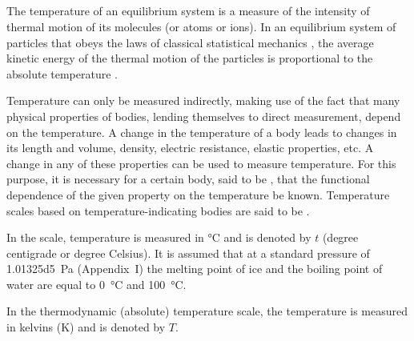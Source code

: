 \subsection{}\label{8.3.4} The temperature of an equilibrium system is a measure of the intensity of thermal motion of its molecules (or atoms or ions). In an equilibrium system of particles that obeys the laws of classical statistical mechanics , the average kinetic energy of the thermal motion of the particles is pro­portional to the absolute temperature .

Temperature can only be measured indirectly, making use of the fact that many physical properties of bodies, lending themselves to direct measurement, depend on the temperature. A change in the temperature of a body leads to changes in its length and volume, density, electric resistance, elastic prop­erties, etc. A change in any of these properties can be used to measure temperature. For this purpose, it is necessary for a certain body, said to be , that the functional dependence of the given property on the temperature be known. Temperature scales based on temperature-indicating bodies are said to be .

In the  scale, temperature is measured in  \si{\degreeCelsius} and is denoted by $t$ (degree centigrade or degree Celsius). It is assumed that at a standard pressure of \SI{1.01325d5}{\pascal} (Appendix~I) the melting point of ice and the boiling point of water are equal to \SI{0}{\degreeCelsius} and \SI{100}{\degreeCelsius}.

In the thermodynamic (absolute) temperature scale, the tem­perature is measured in kelvins (\si{\kelvin}) and is denoted by $T$.

